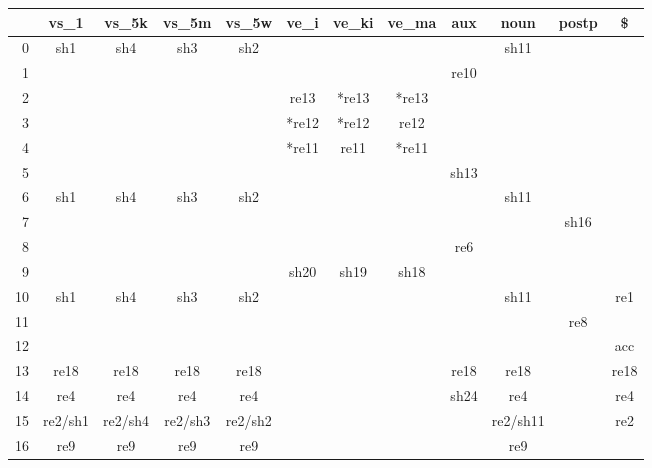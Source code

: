 \begin{figure}[htbp]
  \footnotesize
  \begin{center}
\begin{tabular}{|r|cccc@{}cccccc@{}c|}\hline
        & vs\_1 & vs\_5k        & vs\_5m        & vs\_5w        & ve\_i & ve\_ki        & ve\_ma        & aux   & noun  & postp & \$\\ \hline
0       & sh1   & sh4   & sh3   & sh2   &       &       &       &       & sh11  &       & \\
1       &       &       &       &       &       &       &       & re10  &       &       & \\
2       &       &       &       &       & re13  & *re13  & *re13  &       &       &       & \\
3       &       &       &       &       & *re12  & *re12  & re12  &       &       &       & \\
4       &       &       &       &       & *re11  & re11  & *re11  &       &       &       & \\
5       &       &       &       &       &       &       &       & sh13  &       &       & \\
6       & sh1   & sh4   & sh3   & sh2   &       &       &       &       & sh11  &       & \\
7       &       &       &       &       &       &       &       &       &       & sh16  & \\
8       &       &       &       &       &       &       &       & re6   &       &       & \\
9       &       &       &       &       & sh20  & sh19  & sh18  &       &       &       & \\
10      & sh1   & sh4   & sh3   & sh2   &       &       &       &       & sh11  &       & re1\\
11      &       &       &       &       &       &       &       &       &       & re8   & \\
12      &       &       &       &       &       &       &       &       &       &       & acc\\
13      & re18  & re18  & re18  & re18  &       &       &       & re18  & re18  &       & re18\\
14      & re4   & re4   & re4   & re4   &       &       &       & sh24  & re4   &       & re4\\
15      & re2/sh1       & re2/sh4       & re2/sh3       & re2/sh2       &       &       &       &       & re2/sh11      &       & re2\\
16      & re9   & re9   & re9   & re9   &       &       &       &       & re9   &       & \\

\end{tabular}
\end{center}
\end{figure}

